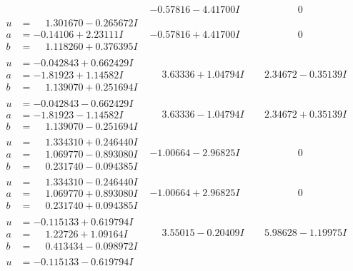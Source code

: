\documentclass[1p]{elsarticle_modified}
\theoremstyle{definition}
\begin{document}
$$\begin{array}{c|c|c}
 & -0.57816 - 4.41700 I & \phantom{-0.000000 } 0 \\ \hline\begin{aligned}
u &= \phantom{-}1.301670 - 0.265672 I \\
a &= -0.14106 + 2.23111 I \\
b &= \phantom{-}1.118260 + 0.376395 I\end{aligned}
 & -0.57816 + 4.41700 I & \phantom{-0.000000 } 0 \\ \hline\begin{aligned}
u &= -0.042843 + 0.662429 I \\
a &= -1.81923 + 1.14582 I \\
b &= \phantom{-}1.139070 + 0.251694 I\end{aligned}
 & \phantom{-}3.63336 + 1.04794 I & \phantom{-}2.34672 - 0.35139 I \\ \hline\begin{aligned}
u &= -0.042843 - 0.662429 I \\
a &= -1.81923 - 1.14582 I \\
b &= \phantom{-}1.139070 - 0.251694 I\end{aligned}
 & \phantom{-}3.63336 - 1.04794 I & \phantom{-}2.34672 + 0.35139 I \\ \hline\begin{aligned}
u &= \phantom{-}1.334310 + 0.246440 I \\
a &= \phantom{-}1.069770 - 0.893080 I \\
b &= \phantom{-}0.231740 - 0.094385 I\end{aligned}
 & -1.00664 - 2.96825 I & \phantom{-0.000000 } 0 \\ \hline\begin{aligned}
u &= \phantom{-}1.334310 - 0.246440 I \\
a &= \phantom{-}1.069770 + 0.893080 I \\
b &= \phantom{-}0.231740 + 0.094385 I\end{aligned}
 & -1.00664 + 2.96825 I & \phantom{-0.000000 } 0 \\ \hline\begin{aligned}
u &= -0.115133 + 0.619794 I \\
a &= \phantom{-}1.22726 + 1.09164 I \\
b &= \phantom{-}0.413434 - 0.098972 I\end{aligned}
 & \phantom{-}3.55015 - 0.20409 I & \phantom{-}5.98628 - 1.19975 I \\ \hline\begin{aligned}
u &= -0.115133 - 0.619794 I \\

\end{aligned}
\end{array}$$
\end{document}
